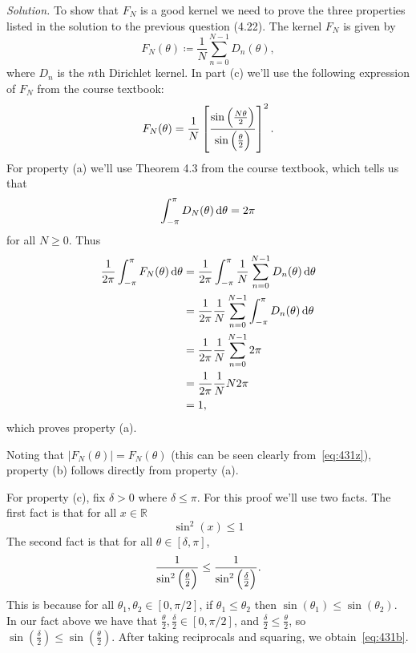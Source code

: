 \documentclass{article}
\newcommand{\R}{\mathbb{R}}
\begin{document}
\textit{Solution.}
To show that $F_N$ is a good kernel we need to prove the three
properties listed in the solution to the previous question (4.22).
The kernel $F_N$ is given by
%
\begin{equation*}
    F_N(\theta) \coloneqq \frac{1}{N} \sum_{n = 0}^{N - 1} D_n (\theta)
    ,
\end{equation*}
%
where $D_n$ is the $n$th Dirichlet kernel. In part (c) we'll use the
following expression of $F_N$ from the course textbook:
%
\begin{equation}
    F_N(\theta) = \frac{1}{N} \sbr{\frac{\sin \del{\frac{N \theta}{2}}}{\sin \del{\frac{\theta}{2}}}}^2
    \label{eq:431z}
    .
\end{equation}
%
For property (a) we'll use Theorem 4.3 from the course textbook, which tells us
that
%
\begin{equation*}
    \int_{- \pi}^\pi D_N(\theta) \dif \theta = 2 \pi
\end{equation*}
%
for all $N \geq 0$. Thus
%
\begin{align*}
    \frac{1}{2 \pi} \int_{- \pi}^\pi F_N(\theta) \dif \theta
        &= \frac{1}{2 \pi} \int_{- \pi}^\pi
            \frac{1}{N} \sum_{n = 0}^{N - 1} D_n(\theta)
            \dif \theta \\
        &= \frac{1}{2 \pi} \frac{1}{N} \sum_{n = 0}^{N - 1}
            \int_{- \pi}^\pi D_n(\theta) \dif \theta \\
        &= \frac{1}{2 \pi} \frac{1}{N} \sum_{n = 0}^{N - 1} 2 \pi \\
        &= \frac{1}{2 \pi} \frac{1}{N} N 2 \pi \\
        &= 1
        ,
\end{align*}
%
which proves property (a).

Noting that $|F_N(\theta)| = F_N(\theta)$ (this can be seen clearly
from~\eqref{eq:431z}), property (b) follows directly from property (a).

For property (c), fix $\delta > 0$ where $\delta \leq \pi$. For
this proof we'll use two facts. The first fact is that for all
$x \in \R$
%
\begin{equation}
    \sin^2(x) \leq 1
    \label{eq:431a}
\end{equation}
%
The second fact is that for all $\theta \in [\delta, \pi]$,
%
\begin{equation}
    \frac{1}{\sin^2 \del{\frac{\theta}{2}}}
    \leq \frac{1}{\sin^2 \del{\frac{\delta}{2}}}
    \label{eq:431b}
    .
\end{equation}
%
This is because for all $\theta_1, \theta_2 \in [0, \pi/2]$,
if $\theta_1 \leq \theta_2$ then $\sin(\theta_1) \leq \sin(\theta_2)$.
In our fact above we have that
$\frac{\theta}{2}, \frac{\delta}{2} \in [0, \pi / 2]$,
and $\frac{\delta}{2} \leq \frac{\theta}{2}$, so
$\sin (\frac{\delta}{2}) \leq \sin (\frac{\theta}{2})$. After taking
reciprocals and squaring, we obtain~\eqref{eq:431b}.
\end{document}
